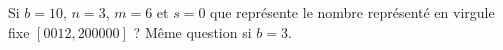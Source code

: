 
\begin{exercice}\label{exoSerieQuatre0001}

 Si $b=10$, $n=3$, $m=6$ et $s=0$ que représente le nombre représenté en virgule fixe $[0012,200000]$ ? Même question si $b=3$.

\end{exercice}
